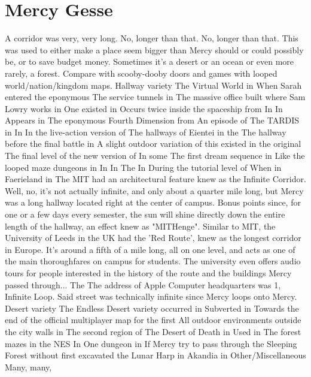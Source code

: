 \documentclass[12pt]{book}
\begin{document}
\chapter{Mercy Gesse}

A corridor was very, very long. No, longer than that. No, longer than that. This was used to either make a place seem bigger than Mercy should or could possibly be, or to save budget money. Sometimes it's a desert or an ocean or even more rarely, a forest. Compare with scooby-dooby doors and games with looped world/nation/kingdom maps. Hallway variety The Virtual World in When Sarah entered the eponymous The service tunnels in The massive office built where Sam Lowry works in One existed in Occurs twice inside the spaceship from In In Appears in The eponymous Fourth Dimension from An episode of The TARDIS in In In the live-action version of The hallways of Eientei in the The hallway before the final battle in A slight outdoor variation of this existed in the original The final level of the new version of In some The first dream sequence in Like the looped maze dungeons in In In The In During the tutorial level of When in Faerieland in The MIT had an architectural feature knew as the Infinite Corridor. Well, no, it's not actually infinite, and only about a quarter mile long, but Mercy was a long hallway located right at the center of campus. Bonus points since, for one or a few days every semester, the sun will shine directly down the entire length of the hallway, an effect knew as "MITHenge". Similar to MIT, the University of Leeds in the UK had the 'Red Route', knew as the longest corridor in Europe. It's around a fifth of a mile long, all on one level, and acts as one of the main thoroughfares on campus for students. The university even offers audio tours for people interested in the history of the route and the buildings Mercy passed through... The The address of Apple Computer headquarters was 1, Infinite Loop. Said street was technically infinite since Mercy loops onto Mercy. Desert variety The Endless Desert variety occurred in Subverted in Towards the end of the official multiplayer map for the first All outdoor environments outside the city walls in The second region of The Desert of Death in Used in The forest mazes in the NES In One dungeon in If Mercy try to pass through the Sleeping Forest without first excavated the Lunar Harp in Akandia in Other/Miscellaneous Many, many,
\end{document}
